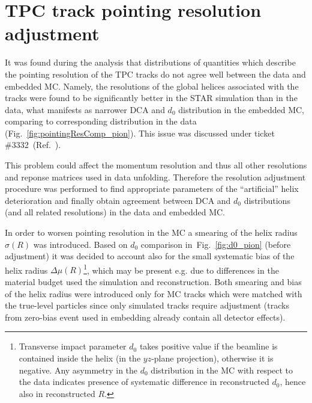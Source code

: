 

\chapter{TPC track pointing resolution adjustment}\label{chap:tpcTrackPointingRes}

It was found during the analysis that distributions of quantities which describe the pointing resolution of the TPC tracks do not agree well between the data and embedded MC. Namely, the resolutions of the global helices associated with the tracks were found to be significantly better in the STAR simulation than in the data, what manifests as narrower DCA and $d_{0}$ distribution in the embedded MC, comparing to corresponding distribution in the data (Fig.~\ref{fig:pointingResComp_pion}). This issue was discussed under ticket \#3332~(Ref.~\cite{dcaTicket}).

This problem could affect the momentum resolution and thus all other resolutions and reponse matrices used in data unfolding. Therefore the resolution adjustment procedure was performed to find appropriate parameters of the ``artificial'' helix deterioration and finally obtain agreement between DCA and $d_{0}$ distributions (and all related resolutions) in the data and embedded MC.

In order to worsen pointing resolution in the MC a smearing of the helix radius $\sigma(R)$ was introduced. Based on $d_{0}$ comparison in~Fig.~\ref{fig:d0_pion} (before adjustment) it was decided to account also for the small systematic bias of the helix radius $\Delta\mu(R)$\footnote{Transverse impact parameter $d_{0}$ takes positive value if the beamline is contained inside the helix (in the $yz$-plane projection), otherwise it is negative. Any asymmetry in the $d_{0}$ distribution in the MC with respect to the data indicates presence of systematic difference in reconstructed $d_{0}$, hence also in reconstructed $R$.}, which may be present e.g. due to differences in the material budget used the simulation and reconstruction. Both smearing and bias of the helix radius were introduced only for MC tracks which were matched with the true-level particles since only simulated tracks require adjustment (tracks from zero-bias event used in embedding already contain all detector effects).

